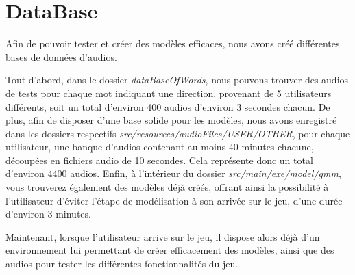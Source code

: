 \section{DataBase}
\label{sec:data_base}

Afin de pouvoir tester et créer des modèles efficaces, nous avons créé différentes bases de données d'audios.

Tout d'abord, dans le dossier \textit{dataBaseOfWords}, nous pouvons trouver des audios de tests pour chaque mot indiquant une direction, provenant de 5 utilisateurs différents, soit un total d'environ 400 audios d'environ 3 secondes chacun.
De plus, afin de disposer d'une base solide pour les modèles, nous avons enregistré dans les dossiers respectifs \textit{src/resources/audioFiles/USER/OTHER}, pour chaque utilisateur, une banque d'audios contenant au moins 40 minutes chacune, découpées en fichiers audio de 10 secondes.
Cela représente donc un total d'environ 4400 audios.
Enfin, à l'intérieur du dossier \textit{src/main/exe/model/gmm}, vous trouverez également des modèles déjà créés, offrant ainsi la possibilité à l'utilisateur d'éviter l'étape de modélisation à son arrivée sur le jeu, d'une durée d'environ 3 minutes.

Maintenant, lorsque l'utilisateur arrive sur le jeu, il dispose alors déjà d'un environnement lui permettant de créer efficacement des modèles, ainsi que des audios pour tester les différentes fonctionnalités du jeu.
